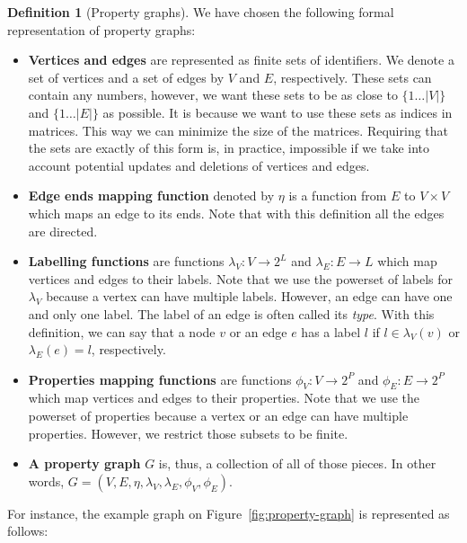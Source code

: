 \documentclass[14pt]{constructor-thesis}
\theoremstyle{definition}
\newtheorem{definition}{Definition}
\begin{document}
\begin{definition}[Property graphs]
  \label{def:property-graph}
  We have chosen the following formal representation of property graphs:
  \begin{itemize}
    \item \textbf{Vertices and edges} are represented as finite sets of identifiers. We denote a set of vertices and a set of edges by $V$ and $E$, respectively. These sets can contain any numbers, however, we want these sets to be as close to $\{1 \dots |V|\}$ and $\{1 \dots |E|\}$ as possible. It is because we want to use these sets as indices in matrices. This way we can minimize the size of the matrices. Requiring that the sets are exactly of this form is, in practice, impossible if we take into account potential updates and deletions of vertices and edges.
    \item \textbf{Edge ends mapping function} denoted by $\eta$ is a function from $E$ to $V \times V$ which maps an edge to its ends. Note that with this definition all the edges are directed.
    \item \textbf{Labelling functions} are functions $\lambda_V : V \to 2^L$ and $\lambda_E : E \to L$ which map vertices and edges to their labels. Note that we use the powerset of labels for $\lambda_V$ because a vertex can have multiple labels. However, an edge can have one and only one label. The label of an edge is often called its \textit{type}. With this definition, we can say that a node $v$ or an edge $e$ has a label $l$ if $l \in \lambda_V(v)$ or $\lambda_E(e) = l$, respectively.
    \item \textbf{Properties mapping functions} are functions $\phi_V : V \to 2^P$ and $\phi_E : E \to 2^P$ which map vertices and edges to their properties. Note that we use the powerset of properties because a vertex or an edge can have multiple properties. However, we restrict those subsets to be finite.
    \item \textbf{A property graph} $G$ is, thus, a collection of all of those pieces. In other words, $G = (V, E, \eta, \lambda_V, \lambda_E, \phi_V, \phi_E)$.
  \end{itemize}
\end{definition}

For instance, the example graph on Figure~\ref{fig:property-graph} is represented as follows:
\end{document}
